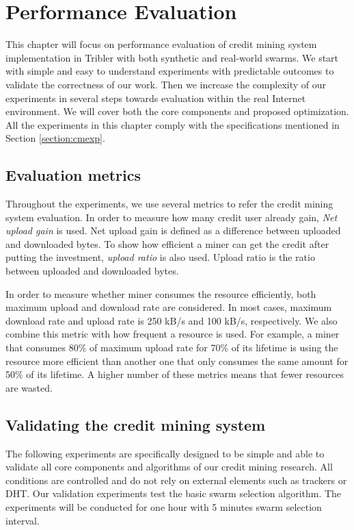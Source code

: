 \chapter{Performance Evaluation}
\label{chp:perfeval}

This chapter will focus on performance evaluation of credit mining system implementation in Tribler with both synthetic and real-world swarms. We start with simple and easy to understand experiments with predictable outcomes to validate the correctness of our work. Then we increase the complexity of our experiments in several steps towards evaluation within the real Internet environment. We will cover both the core components and proposed optimization. All the experiments in this chapter comply with the specifications mentioned in Section \ref{section:cmexp}. 

\section{Evaluation metrics}
\label{section:evalmetrics}
Throughout the experiments, we use several metrics to refer the credit mining system evaluation. In order to measure how many credit user already gain, \textit{Net upload gain}\cite{2015:creditmining:capota} is used. Net upload gain is defined as a difference between uploaded and downloaded bytes. To show how efficient a miner can get the credit after putting the investment, \textit{upload ratio} is also used. Upload ratio is the ratio between uploaded and downloaded bytes.

In order to measure whether miner consumes the resource efficiently, both maximum upload and download rate are considered. In most cases, maximum download rate and upload rate is 250 kB/s and 100 kB/s, respectively. We also combine this metric with how frequent a resource is used. For example, a miner that consumes 80\% of maximum upload rate for 70\% of its lifetime is using the resource more efficient than another one that only consumes the same amount for 50\% of its lifetime. A higher number of these metrics means that fewer resources are wasted. 


\section{Validating the credit mining system}
\label{section:cmsvalidation}
The following experiments are specifically designed to be simple and able to validate all core components and algorithms of our credit mining research. All conditions are controlled and do not rely on external elements such as trackers or DHT. Our validation experiments test the basic swarm selection algorithm. The experiments will be conducted for one hour with 5 minutes swarm selection interval. 

